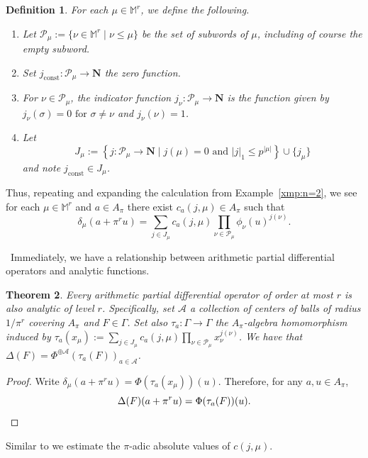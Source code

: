 \documentclass[10pt,a4paper]{amsart}
\newtheorem{thm}{Theorem}[section]
\newtheorem{dff}[thm]{Definition}
\newcommand{\cA}{\mathcal{A}}
\begin{document}
\begin{dff}
For each $\mu \in \mathbb{M}^r$, we define the following. 
\begin{enumerate}
\item  Let $\mathcal{P}_\mu := \{ \nu \in \mathbb{M}^r \mid \nu \leq \mu \}$ be the set of subwords of $\mu$, including of course the empty subword. 
\item Set $j_{\text{const}} \colon \mathcal{P}_\mu \to \mathbf{N}$ the zero function. 
\item For $\nu\in\mathcal{P}_\mu$, the indicator function $j_\nu \colon \mathcal{P}_\mu \to \mathbf{N}$ is the function given by $j_\nu(\sigma)=0\text{ for }\sigma\neq \nu$ and $j_\nu(\nu) = 1$. 
\item Let $$J_\mu := \left\{j \colon \mathcal{P}_\mu\to \mathbf{N}\mid j(\mu)=0\text{ and } |j|_1\leq p^{|\mu|}\right\} \cup \{j_\mu\}$$ and note $j_{\text{const}} \in J_\mu$. 
\end{enumerate}
\end{dff} 

Thus, repeating and expanding the calculation from Example~\ref{xmp:n=2}, we see for each $\mu \in \mathbb{M}^r$ and $a \in A_\pi$ there exist $c_a(j,\mu)\in A_\pi$ such that \[\delta_\mu(a + \pi^r u) = \sum_{j\in J_\mu}c_a(j,\mu)\prod_{\nu\in \mathcal{P}_\mu}\phi_\nu(u)^{j(\nu)}.\] 

 \ 
Immediately, we have a relationship between arithmetic partial differential operators and analytic functions.

\begin{thm}\label{thm:PADOtoAnal} Every arithmetic partial differential operator of order at most $r$ is also analytic of level $r$. Specifically, set $\cA$ a collection of centers of balls of radius $1/\pi^r$ covering $A_\pi$ and $F\in \Gamma$. Set also $\tau_a \colon \Gamma\to \Gamma$ the $A_\pi$-algebra homomorphism induced by $\tau_a(x_\mu) := \sum_{j \in J_\mu} c_a(j,\mu) \prod_{\nu \in \mathcal{P}_\mu} x_\nu^{j(\nu)}$. We have that $\Delta(F) = \Phi^{\oplus \cA}(\tau_a(F))_{a\in \cA}$. 
\end{thm}

\begin{proof}
 Write $\delta_\mu(a+\pi^r u) = \Phi(\tau_a(x_\mu))(u)$.  Therefore, for any $a, u\in A_\pi$, 
\[	\Delta(F)(a+\pi^r u) = \Phi(\tau_a(F))(u).\qedhere\]
\end{proof}


Similar to \cite[Lem. 10]{BRS11} we estimate the $\pi$-adic absolute values of $c(j,\mu)$. 
\end{document}
